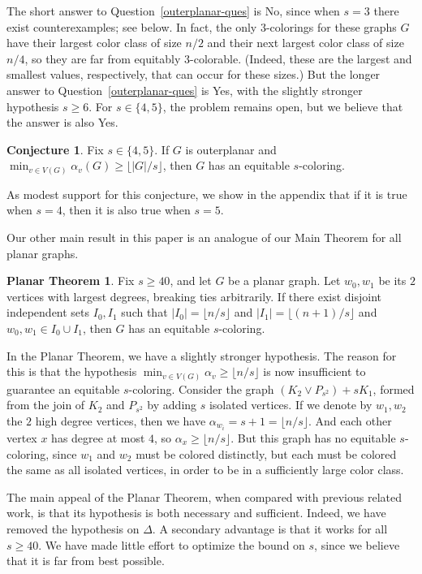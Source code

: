 \documentclass[11pt]{article}
\theoremstyle{definition}
\newtheorem{conj}[lem]{Conjecture}
\newtheorem*{planarthm}{Planar Theorem}
\newcommand\floor[1]{\lfloor#1\rfloor}
\renewcommand\ge\geqslant
\begin{document}
The short answer to Question~\ref{outerplanar-ques} is No, since when $s=3$ there exist counterexamples; see  below.  
In fact, the only $3$-colorings for these graphs $G$ have their largest color class of size $n/2$ and their next largest color class of size 
$n/4$, so they are far from equitably $3$-colorable.  (Indeed, these are the largest and smallest
values, respectively, that can occur for these sizes.) But the longer answer to Question~\ref{outerplanar-ques} 
is Yes, with the slightly stronger hypothesis $s\ge 6$.  For $s\in\{4,5\}$, the problem remains open, but we believe 
that the answer is also Yes.

\begin{conj}
	Fix $s\in \{4,5\}$.  If $G$ is outerplanar and $\min_{v\in V(G)}\alpha_v(G)\ge \floor{|G|/s}$, then $G$ has an equitable $s$-coloring.
	\label{45-conj}
\end{conj}

\noindent
As modest support for this conjecture, we show in the appendix that if it is true when $s=4$, then it is also true when $s=5$.
\smallskip

Our other main result in this paper is an analogue of our Main Theorem for all planar graphs.

\begin{planarthm}
	Fix $s\ge 40$, and let $G$ be a planar graph.  Let $w_0,w_1$ be its $2$ vertices with largest degrees, breaking ties arbitrarily.
	If there exist disjoint independent sets $I_0, I_1$ such that $|I_0|=\floor{n/s}$ and $|I_1| = \floor{(n+1)/s}$ and $w_0,w_1\in I_0\cup I_1$, 
	then $G$ has an equitable $s$-coloring.  
\end{planarthm}

In the Planar Theorem, we have a slightly stronger hypothesis.  The reason for this is that the hypothesis $\min_{v\in V(G)}\alpha_v\ge \floor{n/s}$ is
now insufficient to guarantee an equitable $s$-coloring.  Consider the graph $(K_2\vee P_{s^2})+sK_1$, formed from the join of $K_2$ and $P_{s^2}$
by adding $s$ isolated vertices.  If we denote by $w_1,w_2$ the $2$ high degree vertices, then we have $\alpha_{w_i}=s+1 = \floor{n/s}$.
And each other vertex $x$ has degree at most $4$, so $\alpha_x\ge \floor{n/s}$.  But this graph has no equitable $s$-coloring, since $w_1$ and $w_2$
must be colored distinctly, but each must be colored the same as all isolated vertices, in order to be in a sufficiently large color class.

The main appeal of the Planar Theorem, when compared with previous related work, is that its hypothesis is both necessary and sufficient.  
Indeed, we have removed the hypothesis on $\Delta$.  A secondary advantage is that it works for all $s\ge 40$.  We have made little effort 
to optimize the bound on $s$, since we believe that it is far from best possible.
\end{document}
